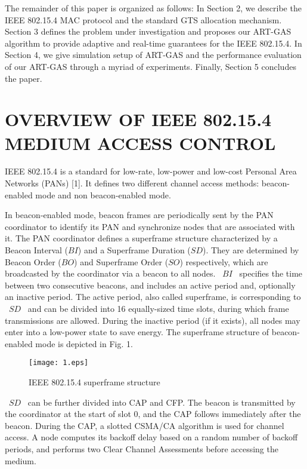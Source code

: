 \documentclass[letterpaper]{sig-alternate-10pt}
\begin{document}
The remainder of this paper is organized as follows: In Section 2, we describe the IEEE 802.15.4 MAC protocol and the standard GTS allocation mechanism. Section 3 defines the problem under investigation and proposes our ART-GAS algorithm to provide adaptive and real-time guarantees for the IEEE 802.15.4. In Section 4, we give simulation setup of ART-GAS and the performance evaluation of our ART-GAS through a myriad of experiments. Finally, Section 5 concludes the paper.

\section{OVERVIEW OF IEEE 802.15.4 MEDIUM ACCESS CONTROL}
IEEE 802.15.4 is a standard for low-rate, low-power and low-cost Personal Area Networks (PANs) [1]. It defines two different channel access methods: beacon-enabled mode and non beacon-enabled mode.

In beacon-enabled mode, beacon frames are periodically sent by the PAN coordinator to identify its PAN and synchronize nodes that are associated with it. The PAN coordinator defines a superframe structure characterized by a Beacon Interval ($BI$) and a Superframe Duration ($SD$). They are determined by Beacon Order ($BO$) and Superframe Order ($SO$) respectively, which are broadcasted by the coordinator via a beacon to all nodes. ~$BI$~ specifies the time between two consecutive beacons, and includes an active period and, optionally an inactive period. The active period, also called superframe, is corresponding to ~$SD$~ and can be divided into 16 equally-sized time slots, during which frame transmissions are allowed. During the inactive period (if it exists), all nodes may enter into a low-power state to save energy. The superframe structure of beacon-enabled mode is depicted in Fig. 1.

\begin{figure}[!t]
\setlength{\abovecaptionskip}{5pt}
\setlength{\belowcaptionskip}{5pt}
\renewcommand{\captionfont}{\bfseries}
\centering
\texttt{[image: 1.eps]}
\centering
\caption{IEEE 802.15.4 superframe structure}
\label{fig_sim}
\end{figure}

~$SD$~ can be further divided into CAP and CFP. The beacon is transmitted by the coordinator at the start of slot 0, and the CAP follows immediately after the beacon. During the CAP, a slotted CSMA/CA algorithm is used for channel access. A node computes its backoff delay based on a random number of backoff periods, and performs two Clear Channel Assessments before accessing the medium.
\end{document}
